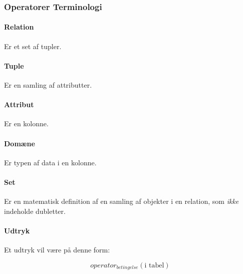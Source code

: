 \subsubsection{Operatorer Terminologi}

\paragraph{Relation}
Er et set af tupler.

\paragraph{Tuple}
Er en samling af attributter.

\paragraph{Attribut}
Er en kolonne.

\paragraph{Domæne}
Er typen af data i en kolonne.

\paragraph{Set}
Er en matematisk definition af en samling af objekter i en relation, som \textit{ikke} indeholde dubletter.

\paragraph{Udtryk}

Et udtryk vil være på denne form:

\begin{equation*}
operator_{betingelse}(\text{i tabel})
\end{equation*}

%
